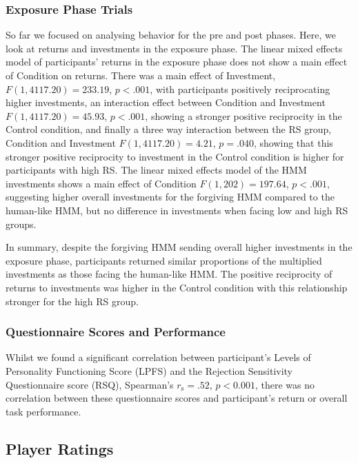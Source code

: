 \documentclass[
]{article}
\begin{document}
\subsubsection{Exposure Phase Trials}\label{exposure-phase-trials}

So far we focused on analysing behavior for the pre and post phases. Here, we look at returns and investments in the exposure phase. The linear mixed effects model of participants' returns in the exposure phase does not show a main effect of Condition on returns. There was a main effect of Investment, \(F(1, 4117.20) = 233.19\), \(p < .001\), with participants positively reciprocating higher investments, an interaction effect between Condition and Investment \(F(1, 4117.20) = 45.93\), \(p < .001\), showing a stronger positive reciprocity in the Control condition, and finally a three way interaction between the RS group, Condition and Investment \(F(1, 4117.20) = 4.21\), \(p = .040\), showing that this stronger positive reciprocity to investment in the Control condition is higher for participants with high RS. The linear mixed effects model of the HMM investments shows a main effect of Condition \(F(1, 202) = 197.64\), \(p < .001\), suggesting higher overall investments for the forgiving HMM compared to the human-like HMM, but no difference in investments when facing low and high RS groups.

In summary, despite the forgiving HMM sending overall higher investments in the exposure phase, participants returned similar proportions of the multiplied investments as those facing the human-like HMM. The positive reciprocity of returns to investments was higher in the Control condition with this relationship stronger for the high RS group.

\subsubsection{Questionnaire Scores and Performance}\label{questionnaire-scores-and-performance}

Whilst we found a significant correlation between participant's Levels of Personality Functioning Score (LPFS) and the Rejection Sensitivity Questionnaire score (RSQ), Spearman's \(r_{\mathrm{s}} = .52\), \(p < 0.001\), there was no correlation between these questionnaire scores and participant's return or overall task performance.

\subsection{Player Ratings}\label{player-ratings}
\end{document}
